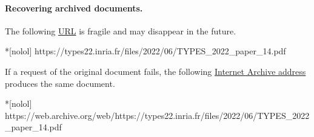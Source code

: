 \paragraph*{Recovering archived documents.}

The following \href{https://types22.inria.fr/files/2022/06/TYPES_2022_paper_14.pdf}{URL} is fragile and may disappear in the future.
\begin{center}
\begin{minipage}{\textwidth}
\begin{cmdlisting}*[nolol]
https://types22.inria.fr/files/2022/06/TYPES_2022_paper_14.pdf
\end{cmdlisting}
\end{minipage}
\end{center}

If a request of the original document fails,
the following \href{https://web.archive.org/web/https://types22.inria.fr/files/2022/06/TYPES_2022_paper_14.pdf}
{Internet Archive address} produces the same document.
\begin{center}
\begin{minipage}{\textwidth}
\begin{cmdlisting}*[nolol]
https://web.archive.org/web/https://types22.inria.fr/files/2022/06/TYPES_2022_paper_14.pdf
\end{cmdlisting}
\end{minipage}
\end{center}